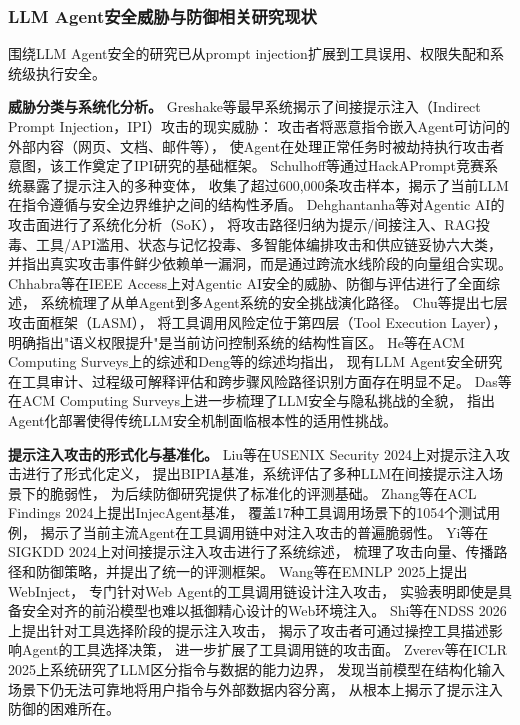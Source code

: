 \subsubsection{LLM Agent安全威胁与防御相关研究现状}

围绕LLM Agent安全的研究已从prompt injection扩展到工具误用、权限失配和系统级执行安全。

\textbf{威胁分类与系统化分析。}
Greshake等\cite{greshake2023notwhat3}最早系统揭示了间接提示注入（Indirect Prompt Injection，IPI）攻击的现实威胁：
攻击者将恶意指令嵌入Agent可访问的外部内容（网页、文档、邮件等），
使Agent在处理正常任务时被劫持执行攻击者意图，该工作奠定了IPI研究的基础框架。
Schulhoff等\cite{schulhoff2023ignore}通过HackAPrompt竞赛系统暴露了提示注入的多种变体，
收集了超过600,000条攻击样本，揭示了当前LLM在指令遵循与安全边界维护之间的结构性矛盾。
Dehghantanha等\cite{dehghantanha2026sokattacksurfaceagentic}对Agentic AI的攻击面进行了系统化分析（SoK），
将攻击路径归纳为提示/间接注入、RAG投毒、工具/API滥用、状态与记忆投毒、多智能体编排攻击和供应链妥协六大类，
并指出真实攻击事件鲜少依赖单一漏洞，而是通过跨流水线阶段的向量组合实现。
Chhabra等\cite{chhabra2025agentic}在IEEE Access上对Agentic AI安全的威胁、防御与评估进行了全面综述，
系统梳理了从单Agent到多Agent系统的安全挑战演化路径。
Chu等\cite{chu2026systematic}提出七层攻击面框架（LASM），
将工具调用风险定位于第四层（Tool Execution Layer），
明确指出"语义权限提升"是当前访问控制系统的结构性盲区。
He等\cite{he2025survey}在ACM Computing Surveys上的综述和Deng等\cite{deng2025agentsunderthreat}的综述均指出，
现有LLM Agent安全研究在工具审计、过程级可解释评估和跨步骤风险路径识别方面存在明显不足。
Das等\cite{das2025security}在ACM Computing Surveys上进一步梳理了LLM安全与隐私挑战的全貌，
指出Agent化部署使得传统LLM安全机制面临根本性的适用性挑战。

\textbf{提示注入攻击的形式化与基准化。}
Liu等\cite{liu2024formalizing}在USENIX Security 2024上对提示注入攻击进行了形式化定义，
提出BIPIA基准，系统评估了多种LLM在间接提示注入场景下的脆弱性，
为后续防御研究提供了标准化的评测基础。
Zhang等\cite{zhang2024injectagent}在ACL Findings 2024上提出InjecAgent基准，
覆盖17种工具调用场景下的1054个测试用例，
揭示了当前主流Agent在工具调用链中对注入攻击的普遍脆弱性。
Yi等\cite{yi2024survey}在SIGKDD 2024上对间接提示注入攻击进行了系统综述，
梳理了攻击向量、传播路径和防御策略，并提出了统一的评测框架。
Wang等\cite{wang2025webinject}在EMNLP 2025上提出WebInject，
专门针对Web Agent的工具调用链设计注入攻击，
实验表明即使是具备安全对齐的前沿模型也难以抵御精心设计的Web环境注入。
Shi等\cite{shi2026pitoolselection}在NDSS 2026上提出针对工具选择阶段的提示注入攻击，
揭示了攻击者可通过操控工具描述影响Agent的工具选择决策，
进一步扩展了工具调用链的攻击面。
Zverev等\cite{zverev2025can}在ICLR 2025上系统研究了LLM区分指令与数据的能力边界，
发现当前模型在结构化输入场景下仍无法可靠地将用户指令与外部数据内容分离，
从根本上揭示了提示注入防御的困难所在。

